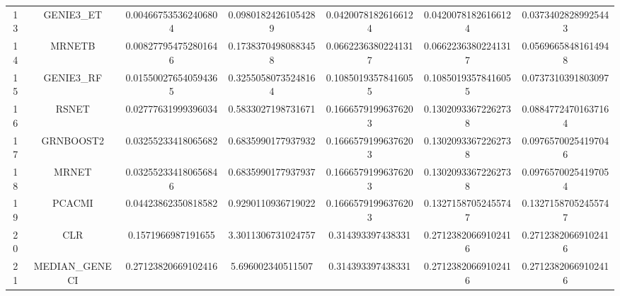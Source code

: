 \documentclass[a4paper,10pt]{article}
\begin{document}
\begin{landscape}
\begin{table}[!htp]
\begin{tabular}{ccccccc}
13&GENIE3_ET&0.004667535362406804&0.09801824261054289&0.04200781826166124&0.04200781826166124&0.03734028289925443\\
14&MRNETB&0.008277954752801646&0.17383704980883458&0.06622363802241317&0.06622363802241317&0.05696658481614948\\
15&GENIE3_RF&0.015500276540594365&0.32550580735248164&0.10850193578416055&0.10850193578416055&0.0737310391803097\\
16&RSNET&0.02777631999396034&0.5833027198731671&0.16665791996376203&0.13020933672262738&0.08847724701637164\\
17&GRNBOOST2&0.03255233418065682&0.6835990177937932&0.16665791996376203&0.13020933672262738&0.09765700254197046\\
18&MRNET&0.032552334180656846&0.6835990177937937&0.16665791996376203&0.13020933672262738&0.09765700254197054\\
19&PCACMI&0.04423862350818582&0.9290110936719022&0.16665791996376203&0.13271587052455747&0.13271587052455747\\
20&CLR&0.1571966987191655&3.3011306731024757&0.314393397438331&0.27123820669102416&0.27123820669102416\\
21&MEDIAN_GENECI&0.27123820669102416&5.696002340511507&0.314393397438331&0.27123820669102416&0.27123820669102416\\
\hline
\end{tabular}
\end{table}


\end{landscape}
\end{document}
